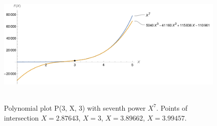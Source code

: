 ﻿\begin{figure}[H]
    \centering
    \includegraphics[width=1\textwidth]{sections/images/05_plots_polynomial_p3_n3_with_seventh}
    ~\caption{Polynomial plot P(3, X, 3) with seventh power $X^7$.
    Points of intersection $X=2.87643$, $X=3$, $X=3.89662$, $X=3.99457$.}\label{fig:figure11}
\end{figure}
